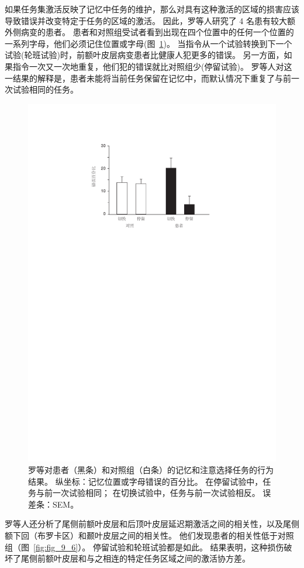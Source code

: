 如果任务集激活反映了记忆中任务的维护，那么对具有这种激活的区域的损害应该导致错误并改变特定于任务的区域的激活。
因此，罗等人\cite{rowe2007prefrontal}研究了 4 名患有较大额外侧病变的患者。
患者和对照组受试者看到出现在四个位置中的任何一个位置的一系列字母，他们必须记住位置或字母(图~\ref{fig:fig_9_5})。
当指令从一个试验转换到下一个试验(轮班试验)时，前额叶皮层病变患者比健康人犯更多的错误。
另一方面，如果指令一次又一次地重复，他们犯的错误就比对照组少(停留试验)。
罗等人对这一结果的解释是，患者未能将当前任务保留在记忆中，而默认情况下重复了与前一次试验相同的任务。
\par


\begin{figure}[!htb]
	\centering
	\includegraphics[width=0.5\linewidth]{chap9/9_5}
	\caption{罗等对患者（黑条）和对照组（白条）的记忆和注意选择任务的行为结果。
		纵坐标：记忆位置或字母错误的百分比。
		在停留试验中，任务与前一次试验相同；
		在切换试验中，任务与前一次试验相反。
		误差条：SEM\cite{rowe2007prefrontal}。\label{fig:fig_9_5}}
\end{figure}

\par


罗等人还分析了尾侧前额叶皮层和后顶叶皮层延迟期激活之间的相关性，以及尾侧额下回（布罗卡区）和颞叶皮层之间的相关性。
他们发现患者的相关性低于对照组（图~\ref{fig:fig_9_6}）。
停留试验和轮班试验都是如此。
结果表明，这种损伤破坏了尾侧前额叶皮层和与之相连的特定任务区域之间的激活协方差。
\par


